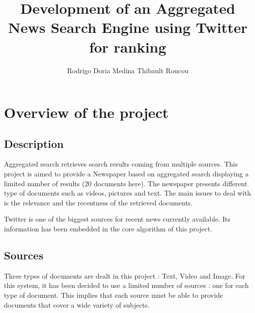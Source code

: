 \documentclass{acmsmall}
\begin{document}

\title{Development of an Aggregated News Search Engine using Twitter for ranking}
\author{Rodrigo Doria Medina
Thibault Roucou
}
                              
\begin{abstract}




\end{abstract}	

\category{}{}{}

\terms{}

\keywords{}

\acmformat{}

\begin{bottomstuff}

\end{bottomstuff}

\maketitle

\section{Overview of the project}

\subsection{Description}

Aggregated search retrieves search results coming from multiple sources. This project is aimed to provide a Newspaper based on aggregated search displaying a limited number of results (20 documents here). The newspaper presents different type of documents such as videos, pictures and text. The main issues to deal with is the relevance and the recentness of the retrieved documents.

Twitter is one of the biggest sources for recent news currently available. Its information has been embedded in the core algorithm of this project. 

\subsection{Sources}
Three types of documents are dealt in this project : Text, Video and Image. For this system, it has been decided to use a limited number of sources : one for each type of document. This implies that each source must be able to provide documents that cover a wide variety of subjects.
\end{document}
